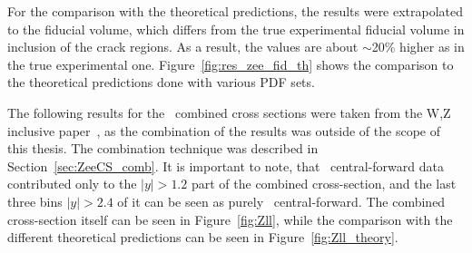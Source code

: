 For the comparison with the theoretical predictions, the results were extrapolated to the fiducial volume, which differs from the true experimental fiducial volume in inclusion of the crack regions. As a result, the values are about $\sim$20\% higher as in the true experimental one. Figure~\ref{fig:res_zee_fid_th} shows the comparison to the theoretical predictions done with various PDF sets.

\begin{figure}
\end{figure}

The following results for the \Zll\ combined cross sections were taken from the W,Z inclusive paper~\cite{lib:wz2011}, as the combination of the results was outside of the scope of this thesis. The combination technique was described in Section~\ref{sec:ZeeCS_comb}. It is important to note, that \Zee\ central-forward data contributed only to the $|y| > 1.2$ part of the combined cross-section, and the last three bins $|y| > 2.4$ of it can be seen as purely \Zee\ central-forward. The combined cross-section itself can be seen in Figure~\ref{fig:Zll}, while the comparison with the different theoretical predictions can be seen in Figure~\ref{fig:Zll_theory}.

